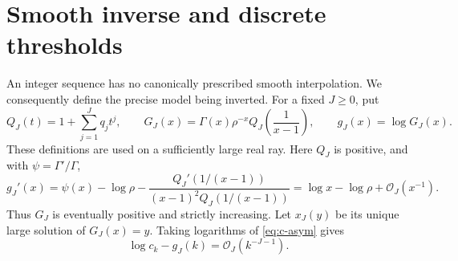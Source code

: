 \documentclass[11pt,letterpaper]{article}
\numberwithin{equation}{section}
\theoremstyle{remark}\newtheorem{remark}[theorem]{Remark}
\newcommand{\Ord}{\mathcal O}
\begin{document}
\section{Smooth inverse and discrete thresholds}
\label{sec:inverse}
An integer sequence has no canonically prescribed smooth interpolation. We consequently define the precise model being inverted. For a fixed $J\ge0$, put
\begin{equation}\label{eq:model}
 Q_J(t)=1+\sum_{j=1}^{J}q_jt^j,\qquad
 G_J(x)=\Gamma(x)\rho^{-x}Q_J\left(\frac1{x-1}\right),\qquad
 g_J(x)=\log G_J(x).
\end{equation}
These definitions are used on a sufficiently large real ray. Here $Q_J$ is positive, and with $\psi=\Gamma'/\Gamma$,
\begin{equation}\label{eq:model-derivative}
 g_J'(x)=\psi(x)-\log\rho
 -\frac{Q_J'(1/(x-1))}{(x-1)^2Q_J(1/(x-1))}
 =\log x-\log\rho+\Ord_J(x^{-1}).
\end{equation}
Thus $G_J$ is eventually positive and strictly increasing. Let $x_J(y)$ be its unique large solution of $G_J(x)=y$. Taking logarithms of \eqref{eq:c-asym} gives
\begin{equation}\label{eq:log-error}
 \log c_k-g_J(k)=\Ord_J(k^{-J-1}).
\end{equation}
\end{document}
